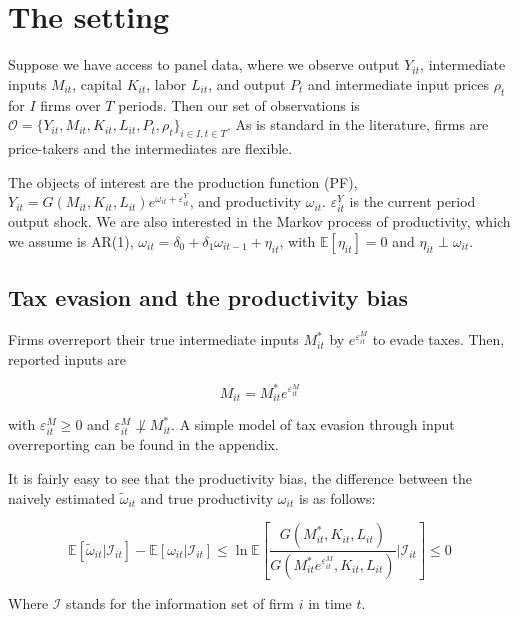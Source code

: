 \documentclass[
  12pt]{article}
\theoremstyle{definition}
\theoremstyle{remark}
\begin{document}
\hypertarget{the-setting}{%
\section{The setting}\label{the-setting}}

Suppose we have access to panel data, where we observe output
\(Y_{it}\), intermediate inputs \(M_{it}\), capital \(K_{it}\), labor
\(L_{it}\), and output \(P_{t}\) and intermediate input prices
\(\rho_t\) for \(I\) firms over \(T\) periods. Then our set of
observations is
\(\mathcal O = \{Y_{it}, M_{it}, K_{it}, L_{it}, P_{t}, \rho_t\}_{i\in I, t \in T}\).
As is standard in the literature, firms are price-takers and the
intermediates are flexible.

The objects of interest are the production function (PF),
\(Y_{it}=G(M_{it}, K_{it}, L_{it})e^{\omega_{it}+\varepsilon^Y_{it}}\),
and productivity \(\omega_{it}\). \(\varepsilon^Y_{it}\) is the current
period output shock. We are also interested in the Markov process of
productivity, which we assume is AR(1),
\(\omega_{it}=\delta_0 + \delta_1 \omega_{it-1}+\eta_{it}\), with
\(\mathbb{E}[\eta_{it}]=0\) and \(\eta_{it}\perp\omega_{it}\).

\hypertarget{tax-evasion-and-the-productivity-bias}{%
\subsection{Tax evasion and the productivity
bias}\label{tax-evasion-and-the-productivity-bias}}

Firms overreport their true intermediate inputs \(M^*_{it}\) by
\(e^{\varepsilon^M_{it}}\) to evade taxes. Then, reported inputs are

\[
M_{it}=M^*_{it}e^{\varepsilon^M_{it}}   
\]

with \(\varepsilon_{it}^M\ge0\) and
\(\varepsilon_{it}^M\not\perp M^*_{it}\). A simple model of tax evasion
through input overreporting can be found in the appendix.

It is fairly easy to see that the productivity bias, the difference
between the naively estimated \(\tilde\omega_{it}\) and true
productivity \(\omega_{it}\) is as follows:

\[
 \mathbb{E}[\tilde\omega_{it}|\mathcal{I}_{it}]-
    \mathbb{E}[\omega_{it}|\mathcal{I}_{it}] \le
      \ln\mathbb{E}\left[
        \frac{G(M^*_{it}, K_{it}, L_{it})}{G(M^*_{it}e^{\varepsilon^M_{it}}, K_{it}, L_{it})}\Bigg|\mathcal{I}_{it}\right] \le 0
\]

Where \(\mathcal{I}\) stands for the information set of firm \(i\) in
time \(t\).
\end{document}
